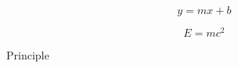\lipsum[2]

\begin{equation}
    y=mx+b
\end{equation}

\begin{equation}
    E=mc^2
\end{equation}

\lipsum[1-2]

\begin{principle}{Principle}
    \lipsum[8]
\end{principle}

\lipsum[9-11]